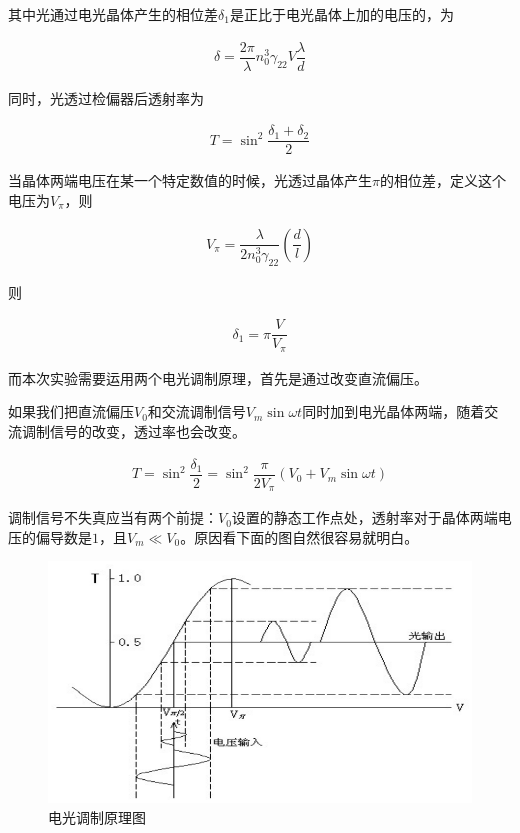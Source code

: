 \documentclass{ctexart}
\begin{document}
其中光通过电光晶体产生的相位差$\delta_1$是正比于电光晶体上加的电压的，为

\begin{equation*}
  \begin{aligned}
    \delta = \dfrac{2 \pi}{\lambda} n_0^3 \gamma_{22} V \dfrac{\lambda}{d}  
  \end{aligned}
\end{equation*}

同时，光透过检偏器后透射率为

\begin{equation*}
  \begin{aligned}
    T = \sin^2 \dfrac{\delta_1 + \delta_2}{2} 
  \end{aligned}
\end{equation*}

当晶体两端电压在某一个特定数值的时候，光透过晶体产生$\pi$的相位差，定义这个电压为$V_{\pi}$，则

\begin{equation*}
  \begin{aligned}
    V_{\pi} = \dfrac{\lambda}{2 n_0^3 \gamma_{22}} \left( \dfrac{d}{l}  \right)  
  \end{aligned}
\end{equation*}

则

\begin{equation*}
  \begin{aligned}
    \delta_1 = \pi \dfrac{V}{V_{\pi}} 
  \end{aligned}
\end{equation*}

而本次实验需要运用两个电光调制原理，首先是通过改变直流偏压。

如果我们把直流偏压$V_0$和交流调制信号$V_m \sin \omega t$同时加到电光晶体两端，随着交流调制信号的改变，透过率也会改变。

\begin{equation*}
  \begin{aligned}
    T = \sin^2 \dfrac{\delta_1}{2} = \sin^2 \dfrac{\pi}{2 V_{\pi}} \left( V_0 + V_m \sin \omega t \right)  
  \end{aligned}
\end{equation*}

调制信号不失真应当有两个前提：$V_0$设置的静态工作点处，透射率对于晶体两端电压的偏导数是$1$，且$V_m \ll V_0$。原因看下面的图自然很容易就明白。

\begin{figure}[H]
  \centering
  \includegraphics[width=0.7\linewidth]{figures/电光调制原理}
  \caption{电光调制原理图}
\end{figure}
\end{document}
